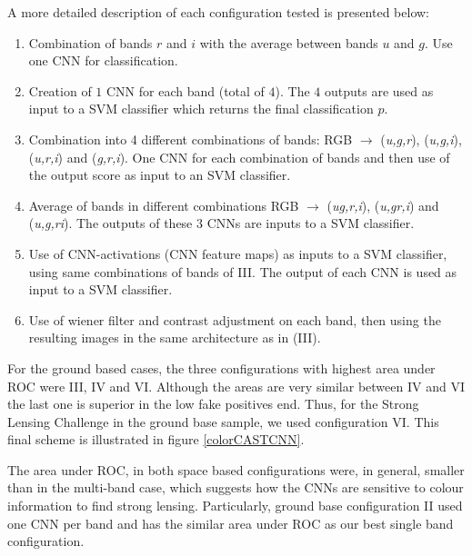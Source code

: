\documentclass{aa}
\begin{document}
A more detailed description of each configuration tested is presented below:
\begin{enumerate}[label=\Roman*.]
\item Combination of bands $r$ and $i$ with the average between bands $u$ and $g$. Use one CNN for classification.
\item Creation of $1$ CNN for each band (total of $4$). The $4$ outputs are used as input to a SVM classifier which returns the final classification $p$. 
\item Combination into 4 different combinations of bands:  RGB $\rightarrow$ (\textit{u,g,r}), (\textit{u,g,i}), (\textit{u,r,i}) and (\textit{g,r,i}). One CNN for each combination of bands and then use of the output score as input to an SVM classifier.
%
\item  Average of bands in different combinations RGB $\rightarrow$ (\textit{ug,r,i}), (\textit{u,gr,i}) and (\textit{u,g,ri}). The outputs of these 3 CNNs are inputs to a SVM classifier.
\item Use of CNN-activations (CNN feature maps) as inputs to a SVM classifier, using same combinations of bands of III. The output of each CNN is used as input to a SVM classifier.
\item Use of wiener filter and contrast adjustment on each band, then using the resulting images in the same architecture as in (III). 
\end{enumerate}

For the ground based cases, the three configurations with highest area under ROC were III, IV and VI. Although the areas are very similar between IV and VI the last one is superior in the low fake positives end. Thus, for the Strong Lensing Challenge in the ground base sample, we used configuration VI. This final scheme is illustrated in figure \ref{colorCASTCNN}.

The area under ROC, in both space based configurations were, in general, smaller than in the multi-band case, which suggests how the CNNs are sensitive to colour information to find strong lensing. Particularly,  ground base configuration II used one CNN per band and has the similar area under ROC as our best single band configuration. 


\end{document}
